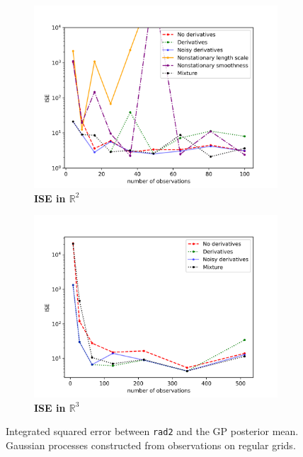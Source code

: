 \documentclass{article}
\newcommand{\R}{\mathbb{R}}
\numberwithin{equation}{section}
\begin{document}
\begin{figure}
\begin{subfigure}[t]{.4\textwidth}
      \includegraphics[scale=0.35]{figures/crazy-2D.png}
      \caption{\textbf{ISE in $\R^2$}}
    \end{subfigure}%
    \begin{subfigure}[t]{.4\textwidth}
      \centering
      \includegraphics[scale=0.35]{figures/crazy-3D.png}
      \caption{\textbf{ISE in $\R^3$}}
    \end{subfigure}
		\caption{Integrated squared error between \texttt{rad2} and the GP posterior mean. Gaussian processes constructed from observations on regular grids.}
		\label{crazy}
\end{figure}
\end{document}
